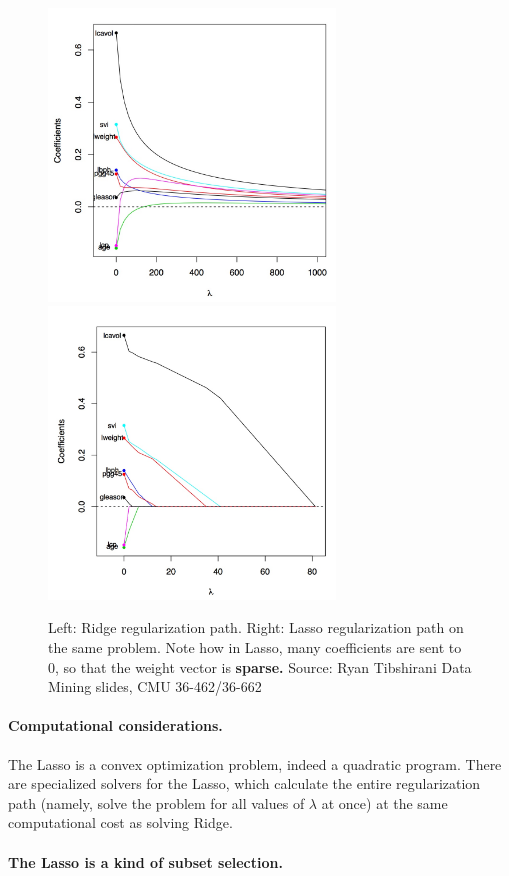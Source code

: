 \documentclass[11pt]{article}
\begin{document}
\begin{figure}[H]
      \centering
      \includegraphics[width=3in]{ridge_path.jpeg}
      \,\,
      \includegraphics[width=3in]{lasso_path.jpeg}
      \caption{Left: Ridge regularization path. 
        Right: Lasso regularization path on the same problem. 
        Note how in Lasso, many
        coefficients are sent to $0$, so that the weight vector is {\bf sparse.}
        Source: Ryan Tibshirani Data Mining slides, CMU 36-462/36-662 }
    \end{figure}


\paragraph{Computational considerations.}
The Lasso is a convex optimization problem, indeed a quadratic program. There
are specialized solvers for the Lasso, which calculate the entire regularization
path (namely, solve the problem for all values of $\lambda$ at once) at the same
computational cost as solving Ridge. 

\paragraph{The Lasso is a kind of subset selection.}
\end{document}
